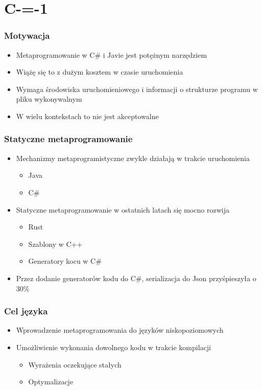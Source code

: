 \section{C-=-1}

\begin{frame}
	\frametitle{Motywacja}

	\begin{itemize}
		\item Metaprogramowanie w C\# i Javie jest potężnym narzędziem
		\item Wiążę się to z dużym kosztem w czasie uruchomienia
		\item Wymaga środowiska uruchomieniowego i informacji o strukturze programu w pliku wykonywalnym
		\item W wielu kontekstach to nie jest akceptowalne
	\end{itemize}
\end{frame}

\begin{frame}
	\frametitle{Statyczne metaprogramowanie}

	\begin{itemize}
		\item Mechanizmy metaprogramistyczne zwykle działają w trakcie uruchomienia\begin{itemize}
			\item Java
			\item C\#
		\end{itemize}
		\item Statyczne metaprogramowanie w ostatnich latach się mocno rozwija\begin{itemize}
			\item Rust
			\item Szablony w C++
			\item Generatory kocu w C\#
		\end{itemize}
		\item Przez dodanie generatorów kodu do C\#, serializacja do Json przyśpieszyła o 30\%
	\end{itemize}

\end{frame}

\begin{frame}
	\frametitle{Cel języka}

	\begin{itemize}
		\item Wprowadzenie metaprogramowania do języków niskopoziomowych
		\item Umożliwienie wykonania dowolnego kodu w trakcie kompilacji\begin{itemize}
			\item Wyrażenia oczekujące stałych
			\item Optymalizacje
		\end{itemize}
	\end{itemize}

\end{frame}

